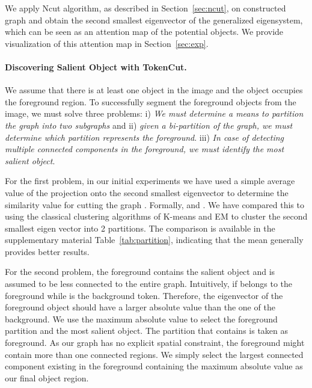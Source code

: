 \documentclass[twocolumn]{article}
\begin{document}
We apply Ncut algorithm, as described in Section~\ref{sec:ncut}, on constructed graph  and obtain the second smallest eigenvector of the generalized eigensystem, which can be seen as an attention map of the potential objects. We provide visualization of this attention map in Section~\ref{sec:exp}.


\paragraph{Discovering Salient Object with TokenCut.} 
We assume that there is at least one object in the image and the object occupies the foreground region. To successfully segment the foreground objects from the image, we must solve three  problems: 
i) \emph{We must determine a means to partition the graph into two subgraphs} and ii) \emph{given a bi-partition of the graph, we must determine which partition represents the foreground}. iii) \emph{In case of detecting multiple connected components in the foreground, we  must identify the most salient object}.

For the first problem, in our initial experiments we have used a simple average value of the projection onto the second smallest eigenvector to determine the similarity value for cutting the graph . 
Formally,  and . We have compared this to using the classical clustering algorithms of K-means and EM to cluster the second smallest eigen vector into 2 partitions. The comparison is available in the supplementary material Table~\ref{tab:partition}, indicating that the mean generally provides better results. 

For the second problem, the foreground contains the salient object and is assumed to be less connected to the entire graph. Intuitively,  if  belongs to the foreground while  is the background token. Therefore, the eigenvector of the foreground object should have a larger absolute value than the one of the background. We use the maximum absolute value  to select the foreground partition and the most salient object. The partition that contains  is taken as foreground. As our graph has no explicit spatial constraint, the foreground might contain more than one connected regions. We simply select the largest connected component existing in the foreground containing the maximum absolute value  as our final object region.
\end{document}
